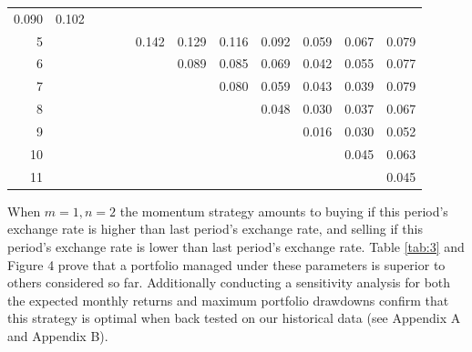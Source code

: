 \documentclass{article}
\begin{document}
\begin{table}[h!]
{\begin{tabular}{rlllllllllll}
  \cellcolor[HTML]{FDCC7E}0.090 &
  \cellcolor[HTML]{FEDC81}0.102 \\
\multicolumn{1}{r|}{5} &
   &
   &
   &
   &
  \cellcolor[HTML]{F0E784}0.142 &
  \cellcolor[HTML]{F7E984}0.129 &
  \cellcolor[HTML]{FEEB84}0.116 &
  \cellcolor[HTML]{FDCF7E}0.092 &
  \cellcolor[HTML]{FBA276}0.059 &
  \cellcolor[HTML]{FBAD78}0.067 &
  \cellcolor[HTML]{FCBD7B}0.079 \\
\multicolumn{1}{r|}{6} &
   &
   &
   &
   &
   &
  \cellcolor[HTML]{FDCA7D}0.089 &
  \cellcolor[HTML]{FCC57C}0.085 &
  \cellcolor[HTML]{FBB078}0.069 &
  \cellcolor[HTML]{F98B71}0.042 &
  \cellcolor[HTML]{FA9E75}0.055 &
  \cellcolor[HTML]{FCBB7A}0.077 \\
\multicolumn{1}{r|}{7} &
   &
   &
   &
   &
   &
   &
  \cellcolor[HTML]{FCBF7B}0.080 &
  \cellcolor[HTML]{FBA376}0.059 &
  \cellcolor[HTML]{F98E72}0.043 &
  \cellcolor[HTML]{F98871}0.039 &
  \cellcolor[HTML]{FCBE7B}0.079 \\
\multicolumn{1}{r|}{8} &
   &
   &
   &
   &
   &
   &
   &
  \cellcolor[HTML]{FA9473}0.048 &
  \cellcolor[HTML]{F97C6E}0.030 &
  \cellcolor[HTML]{F98570}0.037 &
  \cellcolor[HTML]{FBAE78}0.067 \\
\multicolumn{1}{r|}{9} &
   &
   &
   &
   &
   &
   &
   &
   &
  \cellcolor[HTML]{F8696B}0.016 &
  \cellcolor[HTML]{F97C6E}0.030 &
  \cellcolor[HTML]{FA9974}0.052 \\
\multicolumn{1}{r|}{10} &
   &
   &
   &
   &
   &
   &
   &
   &
   &
  \cellcolor[HTML]{FA9072}0.045 &
  \cellcolor[HTML]{FBA977}0.063 \\
\multicolumn{1}{r|}{11} &
   &
   &
   &
   &
   &
   &
   &
   &
   &
   &
  \cellcolor[HTML]{FA8F72}0.045
\end{tabular}%
}
\end{table}

When $m = 1, n=2$ the momentum strategy amounts to buying if this period’s exchange rate is higher than last period’s exchange rate, and selling if this period’s exchange rate is lower than last period’s exchange rate. Table \ref{tab:3} and Figure 4 prove that a portfolio managed under these parameters is superior to others considered so far. Additionally conducting a sensitivity analysis for both the expected monthly returns and maximum portfolio drawdowns confirm that this strategy is optimal when back tested on our historical data (see Appendix A and Appendix B).
\end{document}
